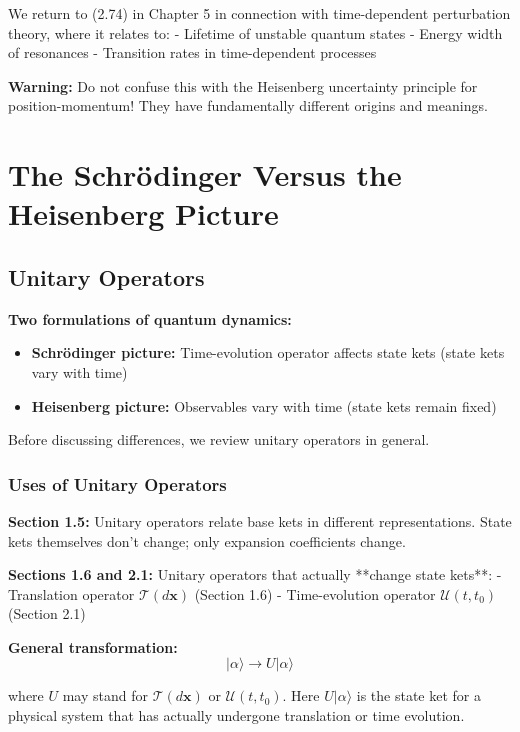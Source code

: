 \documentclass[11pt,a4paper]{article}
\begin{document}
We return to (2.74) in Chapter 5 in connection with time-dependent perturbation theory, where it relates to:
- Lifetime of unstable quantum states
- Energy width of resonances
- Transition rates in time-dependent processes

\textbf{Warning:} Do not confuse this with the Heisenberg uncertainty principle for position-momentum! They have fundamentally different origins and meanings.

\newpage
\section{The Schrödinger Versus the Heisenberg Picture}

\subsection{Unitary Operators}

\textbf{Two formulations of quantum dynamics:}
\begin{itemize}
\item \textbf{Schrödinger picture:} Time-evolution operator affects state kets (state kets vary with time)
\item \textbf{Heisenberg picture:} Observables vary with time (state kets remain fixed)
\end{itemize}

Before discussing differences, we review unitary operators in general.

\subsubsection{Uses of Unitary Operators}

\textbf{Section 1.5:} Unitary operators relate base kets in different representations. State kets themselves don't change; only expansion coefficients change.

\textbf{Sections 1.6 and 2.1:} Unitary operators that actually **change state kets**:
- Translation operator $\mathcal{T}(d\mathbf{x})$ (Section 1.6)
- Time-evolution operator $\mathscr{U}(t, t_0)$ (Section 2.1)

\textbf{General transformation:}
\begin{equation}
|\alpha\rangle \to U|\alpha\rangle
\tag{2.75}
\end{equation}

where $U$ may stand for $\mathcal{T}(d\mathbf{x})$ or $\mathscr{U}(t, t_0)$. Here $U|\alpha\rangle$ is the state ket for a physical system that has actually undergone translation or time evolution.
\end{document}
